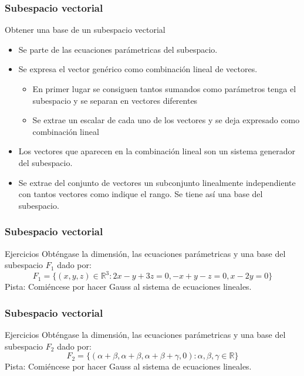 \documentclass{beamer}
\begin{document}
\begin{frame}
  \frametitle{Subespacio vectorial}
\begin{block}{Obtener una base de un subespacio vectorial}
\begin{itemize}
\item Se parte de las ecuaciones par\'ametricas del subespacio.
\item Se expresa el vector gen\'erico como combinaci\'on lineal de vectores.
	\begin{itemize}
	\item En primer lugar se consiguen tantos sumandos como par\'ametros tenga el subespacio y se separan en vectores diferentes
	\item Se extrae un escalar de cada uno de los vectores y se deja expresado como combinaci\'on lineal
	\end{itemize}
\item Los vectores que aparecen en la combinaci\'on lineal son un sistema generador del subespacio.
\item Se extrae del conjunto de vectores un subconjunto linealmente independiente con tantos vectores como indique el rango. Se tiene as\'i una base del subespacio.
\end{itemize}
\end{block}

\end{frame}


\begin{frame}
  \frametitle{Subespacio vectorial}
\begin{block}{Ejercicios}
Obt\'engase la dimensi\'on, las ecuaciones par\'ametricas y una base del subespacio $F_1$ dado por:
\[F_1=\{(x,y,z)\in\mathbb R^3: 2x-y+3z = 0, -x+y-z=0,x-2y=0\}\]
Pista: Comi\'encese por hacer Gauss al sistema de ecuaciones lineales.
\end{block}
\end{frame}


\begin{frame}
  \frametitle{Subespacio vectorial}
\begin{block}{Ejercicios}
Obt\'engase la dimensi\'on, las ecuaciones par\'ametricas y una base del subespacio $F_2$ dado por:
\[F_2=\{(\alpha+\beta,\alpha+\beta, \alpha+\beta+\gamma,0): \alpha, \beta, \gamma \in\mathbb R\}\]
Pista: Comi\'encese por hacer Gauss al sistema de ecuaciones lineales.
\end{block}
\end{frame}
\end{document}
